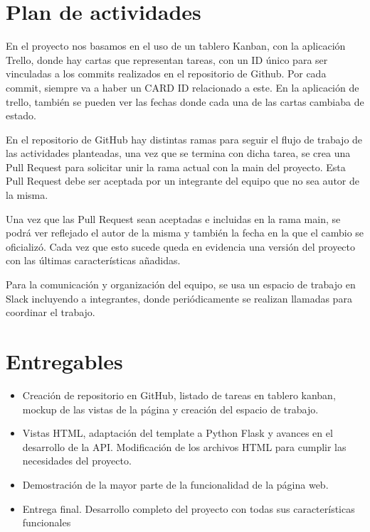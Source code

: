 \documentclass[a4paper,11pt]{article}
\begin{document}
\section*{Plan de actividades}
En el proyecto nos basamos en el uso de un tablero Kanban, con la aplicación Trello, donde hay cartas que representan tareas, con un ID único para ser vinculadas a los commits realizados en el repositorio de Github. Por cada commit, siempre va a haber un CARD ID relacionado a este. En la aplicación de trello, también se pueden ver las fechas donde cada una de las cartas cambiaba de estado.

En el repositorio de GitHub hay distintas ramas para seguir el flujo de trabajo de las actividades planteadas, una vez que se termina con dicha tarea, se crea una Pull Request para solicitar unir la rama actual con la main del proyecto. Esta Pull Request debe ser aceptada por un integrante del equipo que no sea autor de la misma.

Una vez que las Pull Request sean aceptadas e incluidas en la rama main, se podrá ver reflejado el autor de la misma y también la fecha en la que el cambio se oficializó. Cada vez que esto sucede queda en evidencia una versión del proyecto con las últimas características añadidas.

Para la comunicación y organización del equipo, se usa un espacio de trabajo en Slack incluyendo a integrantes, donde periódicamente se realizan llamadas para coordinar el trabajo.
\section*{Entregables}
\begin{itemize}
    \item Creación de repositorio en GitHub, listado de tareas en tablero kanban, mockup de las vistas de la página y creación del espacio de trabajo.
    \item Vistas HTML, adaptación del template a Python Flask y avances en el desarrollo de la API. Modificación de los archivos HTML para cumplir las necesidades del proyecto.
    \item Demostración de la mayor parte de la funcionalidad de la página web.
    \item Entrega final. Desarrollo completo del proyecto con todas sus características funcionales
\end{itemize}
\end{document}
